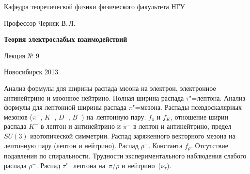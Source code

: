 \documentclass[12pt,pagesize,paper=landscape,paper=192mm:108mm]{scrbook}
\begin{document}
\begin{titlepage}
\begin{center}
    Кафедра теоретической физики физического факультета НГУ
    \medskip

    \Large
    Профессор Черняк В.\,Л.
    \bigskip

    \huge
    \textbf{Теория электрослабых взаимодействий}
    \bigskip

    \Large
    Лекция № 9
    \vfill

    \vfill

\normalsize    Новосибирск 2013
  \smallskip

  \ccbysa
  \end{center}
\end{titlepage}
\newpage

\vspace*{-1em}
\begin{center}
 \vfill
  \begin{minipage}{0.66\linewidth}
    Анализ формулы для ширины распада мюона на электрон, электронное
    антинейтрино и мюонное нейтрино. Полная ширина распада
    $\tau$"=лептона.  Анализ формулы для лептонной ширины распада
    $\pi$"=мезона. Распады псевдоскалярных мезонов ($\pi^-$, $K^-$,
    $D^-$, $B^-$) на~лептонную пару: $f_{\pi}$ и $f_K$, отношение
    ширин распада $K^-$ в лептон и антинейтрино и $\pi^-$ в лептон и
    антинейтрино, предел $SU(3)$ изотопической симметрии. Распад
    заряженного векторного мезона на лептонную пару (лептон и
    нейтрино).  Распад $\rho^-$. Константа $f_{\rho}$. Отсутствие
    подавления по спиральности.  Трудности экспериментального
    наблюдения слабого распада $\rho^-$. Распад $\tau$"=лептона
    на~$\pi$/$\rho$ и нейтрино~($\nu_{\tau}$).
  \end{minipage}
  \vfill

\end{center}
\end{document}
